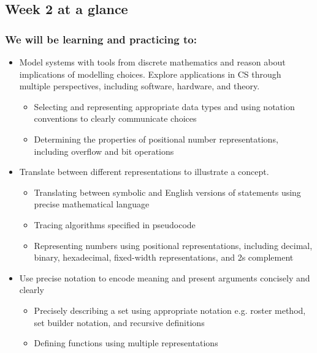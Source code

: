\newpage

\subsection*{Week 2 at a glance}

\subsubsection*{We will be learning and practicing to:}
\begin{itemize}
\item Model systems with tools from discrete mathematics and reason about implications of modelling choices. Explore applications in CS through multiple perspectives, including software, hardware, and theory.
\begin{itemize}
   \item Selecting and representing appropriate data types and using notation conventions to clearly communicate choices
   \item Determining the properties of positional number representations, including overflow and bit operations
\end{itemize}

\item Translate between different representations to illustrate a concept.

\begin{itemize}
   \item Translating between symbolic and English versions of statements using precise mathematical language
   \item Tracing algorithms specified in pseudocode
   \item Representing numbers using positional representations, including decimal, binary, hexadecimal, fixed-width representations, and 2s complement
\end{itemize}


\item Use precise notation to encode meaning and present arguments concisely and clearly
\begin{itemize}
    \item Precisely describing a set using appropriate notation e.g. roster method, set builder notation, and recursive definitions
    \item Defining functions using multiple representations
\end{itemize}


\end{itemize}
